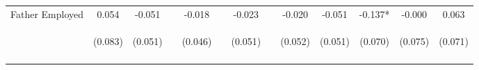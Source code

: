 \begin{tabular}{lcccccccccccc}
\noalign{\smallskip}Father Employed & 0.054 & -0.051 &  & -0.018 &  & -0.023 &  & -0.020 & -0.051 & -0.137* & -0.000 & 0.063\\
 & \begin{footnotesize}(0.083)\end{footnotesize} & \begin{footnotesize}(0.051)\end{footnotesize} & \begin{footnotesize}\end{footnotesize} & \begin{footnotesize}(0.046)\end{footnotesize} & \begin{footnotesize}\end{footnotesize} & \begin{footnotesize}(0.051)\end{footnotesize} & \begin{footnotesize}\end{footnotesize} & \begin{footnotesize}(0.052)\end{footnotesize} & \begin{footnotesize}(0.051)\end{footnotesize} & \begin{footnotesize}(0.070)\end{footnotesize} & \begin{footnotesize}(0.075)\end{footnotesize} & \begin{footnotesize}(0.071)\end{footnotesize}\\
\noalign{\smallskip}\hline\end{tabular}\\
